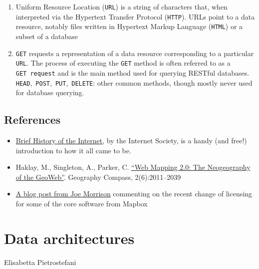 \documentclass[
  letterpaper,
  DIV=11,
  numbers=noendperiod]{scrreprt}
\providecommand{\tightlist}{%
  \setlength{\itemsep}{0pt}\setlength{\parskip}{0pt}}\usepackage{longtable,booktabs,array}
\begin{document}
\begin{enumerate}
\def\labelenumi{\arabic{enumi}.}
\item
  Uniform Resource Location (\texttt{URL}) is a string of characters
  that, when interpreted via the Hypertext Transfer Protocol
  (\texttt{HTTP}). URLs point to a data resource, notably files written
  in Hypertext Markup Language (\texttt{HTML}) or a subset of a database
\item
  \texttt{GET} requests a representation of a data resource
  corresponding to a particular \texttt{URL}. The process of executing
  the \texttt{GET} method is often referred to as a
  \texttt{GET\ request} and is the main method used for querying RESTful
  databases.
  \texttt{HEAD},~\texttt{POST},~\texttt{PUT},~\texttt{DELETE}: other
  common methods, though mostly never used for database querying.
\end{enumerate}

\hypertarget{references-1}{%
\section{References}\label{references-1}}

\begin{itemize}
\tightlist
\item
  \href{https://www.internetsociety.org/resources/doc/2017/brief-history-internet/}{Brief
  History of the Internet}, by the Internet Society, is a handy (and
  free!) introduction to how it all came to be.
\item
  Haklay, M., Singleton, A., Parker, C.
  \href{https://compass.onlinelibrary.wiley.com/doi/abs/10.1111/j.1749-8198.2008.00167.x}{``Web
  Mapping 2.0: The Neogeography of the GeoWeb''}. Geography Compass,
  2(6):2011--2039
\item
  \href{https://joemorrison.medium.com/death-of-an-open-source-business-model-62bc227a7e9b}{A
  blog post from Joe Morrison} commenting on the recent change of
  licensing for some of the core software from Mapbox
\end{itemize}


\hypertarget{data-architectures}{%
\chapter{Data architectures}\label{data-architectures}}

Elisabetta Pietrostefani
\end{document}
